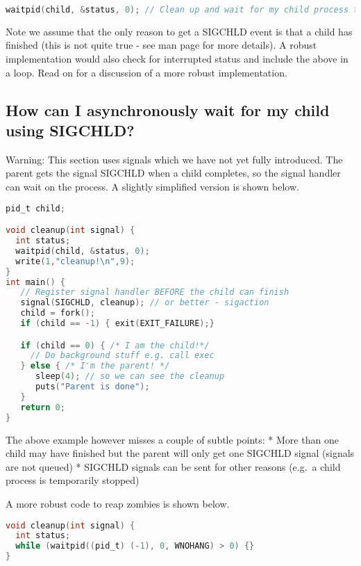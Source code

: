 \begin{lstlisting}[language=C]
waitpid(child, &status, 0); // Clean up and wait for my child process to finish.
\end{lstlisting}

Note we assume that the only reason to get a SIGCHLD event is that a child has finished (this is not quite true - see man page for more details). A robust implementation would also check for interrupted status and include the above in a loop. Read on for a discussion of a more robust implementation.

\begin{aside}

\subsection{How can I asynchronously wait for my child using SIGCHLD?}

Warning: This section uses signals which we have not yet fully introduced. The parent gets the signal SIGCHLD when a child completes, so the signal handler can wait on the process. A slightly simplified version is shown below.

\begin{lstlisting}[language=C]
pid_t child;

void cleanup(int signal) {
  int status;
  waitpid(child, &status, 0);
  write(1,"cleanup!\n",9);
}
int main() {
   // Register signal handler BEFORE the child can finish
   signal(SIGCHLD, cleanup); // or better - sigaction
   child = fork();
   if (child == -1) { exit(EXIT_FAILURE);}

   if (child == 0) { /* I am the child!*/
     // Do background stuff e.g. call exec   
   } else { /* I'm the parent! */
      sleep(4); // so we can see the cleanup
      puts("Parent is done");
   }
   return 0;
} 
\end{lstlisting}

The above example however misses a couple of subtle points: * More than one child may have finished but the parent will only get one SIGCHLD signal (signals are not queued) * SIGCHLD signals can be sent for other reasons (e.g.~a child process is temporarily stopped)

A more robust code to reap zombies is shown below.

\begin{lstlisting}[language=C]
void cleanup(int signal) {
  int status;
  while (waitpid((pid_t) (-1), 0, WNOHANG) > 0) {}
}
\end{lstlisting}
\end{aside}

